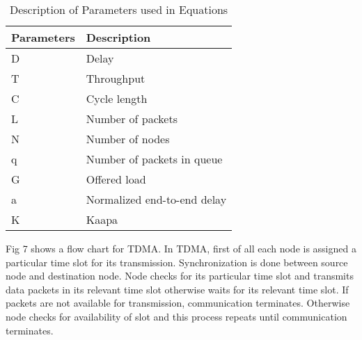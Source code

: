 \documentclass[11pt, conference, compsocconf, onecolumn]{IEEEtran}
\begin{document}
\begin{table}
\caption{Description of Parameters used in Equations}
\begin{center}
    \begin{tabular}{ | p{2.5cm} | p{2.5cm} |}
    \hline
    Parameters & Description\\ \hline
    D & Delay\\ \hline
    T & Throughput\\ \hline
    C & Cycle length\\ \hline
    L & Number of packets\\ \hline
    N & Number of nodes\\ \hline
    q & Number of packets in queue\\ \hline
    G & Offered load\\ \hline
    a & Normalized end-to-end delay\\ \hline
    K & Kaapa\\ \hline
    \end{tabular}
\end{center}
\end{table}

Fig 7 shows a flow chart for TDMA. In TDMA, first of all each node is assigned a particular time slot for its transmission. Synchronization is done between source node and destination node. Node checks for its particular time slot and transmits data packets in its relevant time slot otherwise waits for its relevant time slot. If packets are not available for transmission, communication terminates.  Otherwise node checks for availability of slot and this process repeats until communication terminates.
\end{document}
